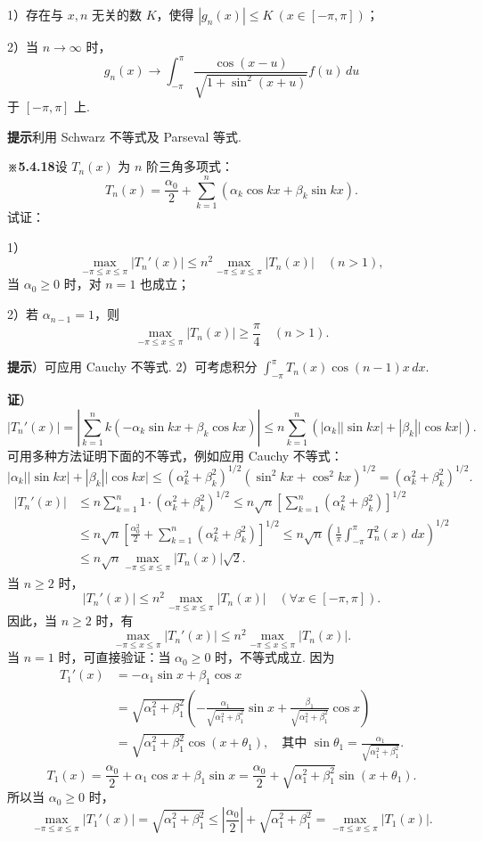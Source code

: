 \documentclass[UTF8, 12pt, fontset=fandol, oneside]{ctexart}
\begin{document}
1）存在与 $x,n$ 无关的数 $K$，使得 $|g_n(x)|\le K\ (x\in[-\pi,\pi])$；

2）当 $n\to\infty$ 时，
\[
  g_n(x)\to\int_{-\pi}^{\pi}
  \frac{\cos(x-u)}{\sqrt{1+\sin^2(x+u)}}f(u)\,du
\]
于 $[-\pi,\pi]$ 上.

\noindent\textbf{提示}\quad 利用 Schwarz 不等式及 Parseval 等式.

\noindent\textbf{※5.4.18}\quad 设 $T_n(x)$ 为 $n$ 阶三角多项式：
\[
  T_n(x)=\frac{\alpha_0}{2}+\sum_{k=1}^{n}(\alpha_k\cos kx+\beta_k\sin kx).
\]
试证：

1）
\[
  \max_{-\pi\le x\le\pi}|T_n'(x)|
  \le n^2\max_{-\pi\le x\le\pi}|T_n(x)|\quad(n>1),
\]
当 $\alpha_0\ge0$ 时，对 $n=1$ 也成立；

2）若 $\alpha_{n-1}=1$，则
\[
  \max_{-\pi\le x\le\pi}|T_n(x)|\ge\frac{\pi}{4}\quad(n>1).
\]

\noindent\textbf{提示}）可应用 Cauchy 不等式. 2）可考虑积分
$\displaystyle\int_{-\pi}^{\pi}T_n(x)\cos(n-1)x\,dx$.

\noindent\textbf{证}）
\[
  |T_n'(x)|=\left|\sum_{k=1}^{n}k(-\alpha_k\sin kx+\beta_k\cos kx)\right|
  \le n\sum_{k=1}^{n}(|\alpha_k||\sin kx|+|\beta_k||\cos kx|).
\]
可用多种方法证明下面的不等式，例如应用 Cauchy 不等式：
\[
  |\alpha_k||\sin kx|+|\beta_k||\cos kx|
  \le(\alpha_k^2+\beta_k^2)^{1/2}(\sin^2kx+\cos^2kx)^{1/2}
  =(\alpha_k^2+\beta_k^2)^{1/2}.
\]
\[
\begin{aligned}
|T_n'(x)|
&\le n\sum_{k=1}^{n}1\cdot(\alpha_k^2+\beta_k^2)^{1/2}
\le n\sqrt n\left[\sum_{k=1}^{n}(\alpha_k^2+\beta_k^2)\right]^{1/2}\\
&\le n\sqrt n\left[\frac{\alpha_0^2}{2}
+\sum_{k=1}^{n}(\alpha_k^2+\beta_k^2)\right]^{1/2}
\le n\sqrt n\left(\frac1\pi\int_{-\pi}^{\pi}T_n^2(x)\,dx\right)^{1/2}\\
&\le n\sqrt n\max_{-\pi\le x\le\pi}|T_n(x)|\sqrt2.
\end{aligned}
\]
当 $n\ge2$ 时，
\[
  |T_n'(x)|\le n^2\max_{-\pi\le x\le\pi}|T_n(x)|\quad(\forall x\in[-\pi,\pi]).
\]
因此，当 $n\ge2$ 时，有
\[
  \max_{-\pi\le x\le\pi}|T_n'(x)|
  \le n^2\max_{-\pi\le x\le\pi}|T_n(x)|.
\]
当 $n=1$ 时，可直接验证：当 $\alpha_0\ge0$ 时，不等式成立. 因为
\[
\begin{aligned}
T_1'(x)&=-\alpha_1\sin x+\beta_1\cos x\\
&=\sqrt{\alpha_1^2+\beta_1^2}
\left(-\frac{\alpha_1}{\sqrt{\alpha_1^2+\beta_1^2}}\sin x
+\frac{\beta_1}{\sqrt{\alpha_1^2+\beta_1^2}}\cos x\right)\\
&=\sqrt{\alpha_1^2+\beta_1^2}\cos(x+\theta_1),
\quad \text{其中 }\sin\theta_1=\frac{\alpha_1}{\sqrt{\alpha_1^2+\beta_1^2}}.
\end{aligned}
\]
\[
  T_1(x)=\frac{\alpha_0}{2}+\alpha_1\cos x+\beta_1\sin x
  =\frac{\alpha_0}{2}+\sqrt{\alpha_1^2+\beta_1^2}\sin(x+\theta_1).
\]
所以当 $\alpha_0\ge0$ 时，
\[
  \max_{-\pi\le x\le\pi}|T_1'(x)|
  =\sqrt{\alpha_1^2+\beta_1^2}
  \le\left|\frac{\alpha_0}{2}\right|+\sqrt{\alpha_1^2+\beta_1^2}
  =\max_{-\pi\le x\le\pi}|T_1(x)|.
\]
\end{document}
